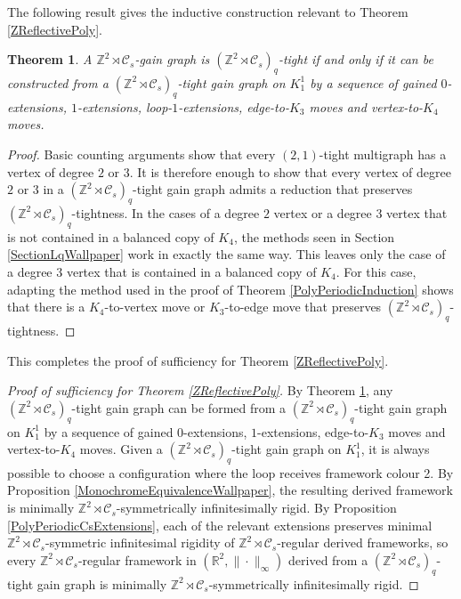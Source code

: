 \documentclass[reqno,a4paper,10pt]{article}
\newtheorem{theorem}{Theorem}[section]
\theoremstyle{definition}
\theoremstyle{remark}
\numberwithin{equation}{section}
\numberwithin{figure}{section}
\numberwithin{table}{section}
\newcommand{\R}{\mathbb{R}}
\newcommand{\Z}{\mathbb{Z}}
\begin{document}
    The following result gives the inductive construction relevant to Theorem \ref{ZReflectivePoly}.
    \begin{theorem}\label{ZReflectivePolyInduction}
        A $\Z^2\rtimes\mathcal{C}_s$-gain graph is $(\Z^2\rtimes\mathcal{C}_s)_q$-tight if and only if it can be constructed from a $(\Z^2\rtimes\mathcal{C}_s)_q$-tight gain graph on $K_1^1$ by a sequence of gained $0$-extensions, $1$-extensions, loop-$1$-extensions, edge-to-$K_3$ moves and vertex-to-$K_4$ moves.
    \end{theorem}
    \begin{proof}
        Basic counting arguments show that every $(2,1)$-tight multigraph has a vertex of degree $2$ or $3$. It is therefore enough to show that every vertex of degree $2$ or $3$ in a $(\Z^2\rtimes\mathcal{C}_s)_q$-tight gain graph admits a reduction that preserves $(\Z^2\rtimes\mathcal{C}_s)_q$-tightness. In the cases of a degree $2$ vertex or a degree $3$ vertex that is not contained in a balanced copy of $K_4$, the methods seen in Section \ref{SectionLqWallpaper} work in exactly the same way. This leaves only the case of a degree $3$ vertex that is contained in a balanced copy of $K_4$. For this case, adapting the method used in the proof of Theorem \ref{PolyPeriodicInduction} shows that there is a $K_4$-to-vertex move or $K_3$-to-edge move that preserves $(\Z^2\rtimes\mathcal{C}_s)_q$-tightness.
    \end{proof}
    This completes the proof of sufficiency for Theorem \ref{ZReflectivePoly}.
     \begin{proof}[Proof of sufficiency for Theorem \ref{ZReflectivePoly}]
        By Theorem \ref{ZReflectivePolyInduction}, any $(\Z^2\rtimes\mathcal{C}_s)_q$-tight gain graph can be formed from a $(\Z^2\rtimes\mathcal{C}_s)_q$-tight gain graph on $K_1^1$ by a sequence of gained $0$-extensions, $1$-extensions, edge-to-$K_3$ moves and vertex-to-$K_4$ moves. Given a $(\Z^2\rtimes\mathcal{C}_s)_q$-tight gain graph on $K_1^1$, it is always possible to choose a configuration where the loop receives framework colour 2. By Proposition \ref{MonochromeEquivalenceWallpaper}, the resulting derived framework is minimally $\Z^2\rtimes\mathcal{C}_s$-symmetrically infinitesimally rigid. By Proposition \ref{PolyPeriodicCsExtensions}, each of the relevant extensions preserves minimal $\Z^2\rtimes\mathcal{C}_s$-symmetric infinitesimal rigidity of $\Z^2\rtimes\mathcal{C}_s$-regular derived frameworks, so every $\Z^2\rtimes\mathcal{C}_s$-regular framework in $(\R^2,\|\cdot\|_\infty)$ derived from a $(\Z^2\rtimes\mathcal{C}_s)_q$-tight gain graph is minimally $\Z^2\rtimes\mathcal{C}_s$-symmetrically infinitesimally rigid.
    \end{proof}
\end{document}
